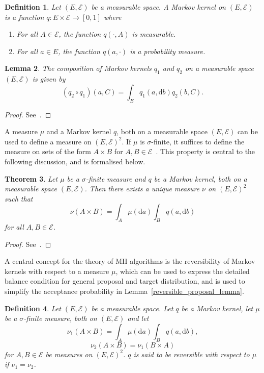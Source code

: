 \documentclass[english,twoside,openright]{HYgraduMLDS}
\newtheorem{lemma}{Lemma}[chapter]
\newtheorem{theorem}[lemma]{Theorem}
\newtheorem{definition}[lemma]{Definition}
\newcommand{\dx}{\mathrm{d}}
\begin{document}
\begin{definition}
	Let \((E, \mathcal{E})\) be a measurable space. A Markov kernel on
  \((E, \mathcal{E})\) is a function \(q\colon E\times \mathcal{E}\to [0, 1]\)
  where
  \begin{enumerate}
    \item For all \(A\in \mathcal{E}\), the function \(q(\cdot, A)\) is
          measurable.
    \item
          For all \(a\in E\), the function \(q(a, \cdot)\) is a probability
          measure.
  \end{enumerate}
\end{definition}

\begin{lemma}\label{markov_kernel_composition_lemma}
	The composition of Markov kernels \(q_{1}\) and \(q_{2}\) on a measurable space
  \((E, \mathcal{E})\) is given by
  \[
    (q_{2}\circ q_{1})(a, C) = \int_{E}q_{1}(a, \dx b)q_{2}(b, C).
  \]
\end{lemma}
\begin{proof}
	See~\cite[Equation 6.5]{Cin11}.
\end{proof}

A measure \(\mu\) and a Markov kernel \(q\), both on a measurable space
\((E, \mathcal{E})\) can be used to define a measure on
\((E, \mathcal{E})^{2}\). If \(\mu\) is \(\sigma\)-finite, it suffices to
define the measure on sets of the form \(A\times B\) for
\(A, B\in \mathcal{E}\)~\cite{Cin11}.
This property is central to the following discussion, and is formalised below.

\begin{theorem}\label{product_measure_theorem}
	Let \(\mu\) be a \(\sigma\)-finite measure and \(q\) be a Markov kernel,
  both on a measurable space \((E, \mathcal{E})\). Then there exists a
  unique measure \(\nu\) on \((E, \mathcal{E})^{2}\) such that
  \[
    \nu(A\times B) = \int_{A}\mu(\dx a)\int_{B}q(a, \dx b)
  \]
  for all \(A, B \in \mathcal{E}\).
\end{theorem}
\begin{proof}
	See~\cite[Theorem 6.11]{Cin11}.
\end{proof}

A central concept for the theory of MH algorithms is the reversibility of
Markov kernels with respect to a measure \(\mu\), which can be used
to express the detailed balance condition for general proposal and target
distribution, and is used to simplify the acceptance probability in
Lemma~\ref{reversible_proposal_lemma}.
\begin{definition}\label{reversible_definition}
	Let \((E, \mathcal{E})\) be a measurable space. Let \(q\) be a Markov kernel,
  let \(\mu\) be a \(\sigma\)-finite measure, both on \((E, \mathcal{E})\) and
  let
  \[
    \nu_{1}(A\times B) = \int_{A}\mu(\dx a)\int_{B}q(a, \dx b),
  \]
  \[
    \nu_{2}(A\times B) = \nu_{1}(B\times A)
  \]
  for \(A, B\in \mathcal{E}\) be measures on \((E, \mathcal{E})^{2}\).
  \(q\) is said to be reversible with respect to \(\mu\) if
  \(\nu_{1} = \nu_{2}\).
\end{definition}
\end{document}

